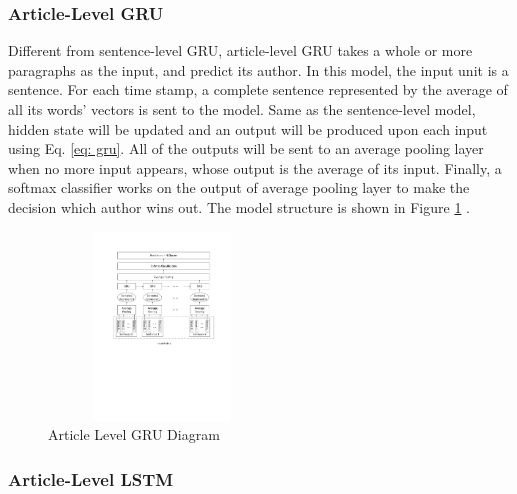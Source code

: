 \documentclass{article} %
\begin{document}
\subsubsection{Article-Level GRU}
Different from sentence-level GRU, article-level GRU takes a whole or more paragraphs as the input, and predict its author. In this model, the input unit is a sentence. For each time stamp, a complete sentence represented by the average of all its words' vectors is sent to the model.  Same as the sentence-level model, hidden state will be updated and an output will be produced upon each input using Eq. \ref{eq: gru}. All of the outputs will be sent to an average pooling layer when no more input appears, whose output is the average of its input. Finally, a softmax classifier works on the output of average pooling layer to make the decision which author wins out. The model structure is shown in Figure \ref{fig: gru_article} .

\begin{figure}[htbp]
\centering
\includegraphics[width = 60mm, height = 50mm]{figures/articleLevelGru.pdf} 
\caption{Article Level GRU Diagram}
\label{fig: gru_article}
\end{figure}


\subsubsection{Article-Level LSTM}
\end{document}
